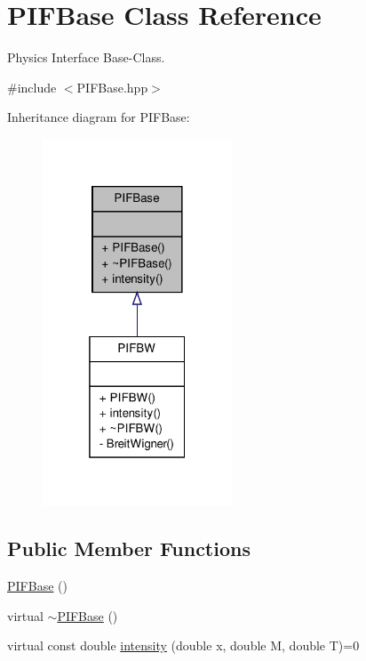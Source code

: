 \hypertarget{classPIFBase}{
\section{PIFBase Class Reference}
\label{d5/d3f/classPIFBase}
}


Physics Interface Base-\/Class.  




{\ttfamily \#include $<$PIFBase.hpp$>$}



Inheritance diagram for PIFBase:
\nopagebreak
\begin{figure}[H]
\begin{center}
\leavevmode
\includegraphics[width=160pt]{d7/d2b/classPIFBase__inherit__graph}
\end{center}
\end{figure}
\subsection*{Public Member Functions}
\begin{DoxyCompactItemize}
\item 
\hyperlink{classPIFBase_aa435256425c756fa92b2008ca7381a47}{PIFBase} ()
\item 
virtual \hyperlink{classPIFBase_a0b598b33b36f0ecda10c9cafe3c8e083}{$\sim$PIFBase} ()
\item 
virtual const double \hyperlink{classPIFBase_a7e0628a7d23475f2471fb9b7262659cf}{intensity} (double x, double M, double T)=0
\end{DoxyCompactItemize}


